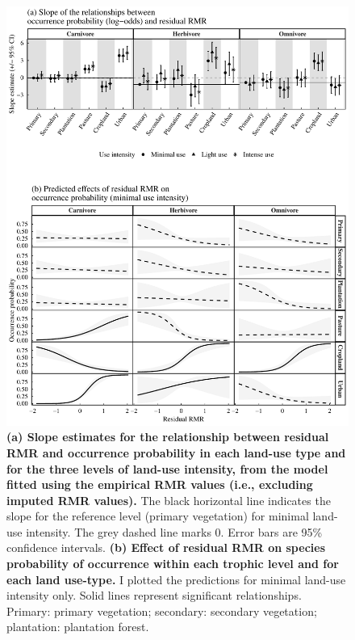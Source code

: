 \newpage
\begin{figure}[h!]
\centering
\includegraphics[scale=0.67]{Supporting/Chapter5/Figures/Figure_predictions_slopes_Complete_data_v2}
\caption[Slope estimates and predictions for the relationship between occurrence probability and residual RMR for the model fitted on empirical RMR values only]{\textbf{(a) Slope estimates for the relationship between residual RMR and occurrence probability in each land-use type and for the three levels of land-use intensity, from the model fitted using the empirical RMR values (i.e., excluding imputed RMR values).} The black horizontal line indicates the slope for the reference level (primary vegetation) for minimal land-use intensity. The grey dashed line marks 0. Error bars are 95\% confidence intervals. \textbf{(b) Effect of residual RMR on species probability of occurrence within each trophic level and for each land use-type.} I plotted the predictions for minimal land-use intensity only. Solid lines represent significant relationships. Primary: primary vegetation; secondary: secondary vegetation; plantation: plantation forest.}
\label{SI5_figure8}
\end{figure}
